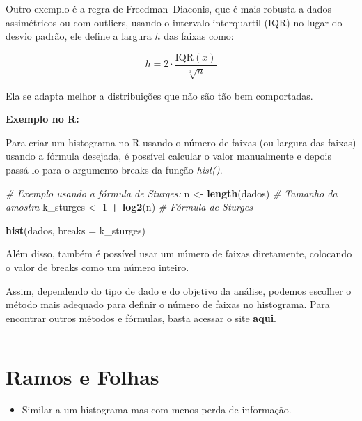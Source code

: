 \documentclass[
]{book}
\newenvironment{Shaded}{\begin{snugshade}}{\end{snugshade}}
\newcommand{\AttributeTok}[1]{\textcolor[rgb]{0.13,0.29,0.53}{#1}}
\newcommand{\CommentTok}[1]{\textcolor[rgb]{0.56,0.35,0.01}{\textit{#1}}}
\newcommand{\DecValTok}[1]{\textcolor[rgb]{0.00,0.00,0.81}{#1}}
\newcommand{\FunctionTok}[1]{\textcolor[rgb]{0.13,0.29,0.53}{\textbf{#1}}}
\newcommand{\NormalTok}[1]{#1}
\newcommand{\OtherTok}[1]{\textcolor[rgb]{0.56,0.35,0.01}{#1}}
\newcommand{\SpecialCharTok}[1]{\textcolor[rgb]{0.81,0.36,0.00}{\textbf{#1}}}
\providecommand{\tightlist}{%
  \setlength{\itemsep}{0pt}\setlength{\parskip}{0pt}}
\begin{document}
Outro exemplo é a regra de Freedman--Diaconis, que é mais robusta a dados assimétricos ou com outliers, usando o intervalo interquartil (IQR) no lugar do desvio padrão, ele define a largura \(h\) das faixas como:

\[
h = 2 \cdot \frac{\text{IQR}(x)}{\sqrt[3]{n}}
\]

Ela se adapta melhor a distribuições que não são tão bem comportadas.

\textbf{Exemplo no R:}

Para criar um histograma no R usando o número de faixas (ou largura das faixas) usando a fórmula desejada, é possível calcular o valor manualmente e depois passá-lo para o argumento breaks da função \emph{hist()}.

\begin{Shaded}
\begin{Highlighting}[]
\CommentTok{\# Exemplo usando a fórmula de Sturges:}
\NormalTok{n }\OtherTok{\textless{}{-}} \FunctionTok{length}\NormalTok{(dados)  }\CommentTok{\# Tamanho da amostra}
\NormalTok{k\_sturges }\OtherTok{\textless{}{-}} \DecValTok{1} \SpecialCharTok{+} \FunctionTok{log2}\NormalTok{(n)  }\CommentTok{\# Fórmula de Sturges}

\FunctionTok{hist}\NormalTok{(dados, }\AttributeTok{breaks =}\NormalTok{ k\_sturges)}
\end{Highlighting}
\end{Shaded}

Além disso, também é possível usar um número de faixas diretamente, colocando o valor de breaks como um número inteiro.

Assim, dependendo do tipo de dado e do objetivo da análise, podemos escolher o método mais adequado para definir o número de faixas no histograma. Para encontrar outros métodos e fórmulas, basta acessar o site \textbf{\href{https://en.wikipedia.org/wiki/Histogram\#Number_of_bins_and_width}{aqui}}.

\begin{center}\rule{0.5\linewidth}{0.5pt}\end{center}

\section{Ramos e Folhas}\label{ramos-e-folhas}

\begin{itemize}
\tightlist
\item
  Similar a um histograma mas com menos perda de informação.
\end{itemize}
\end{document}
